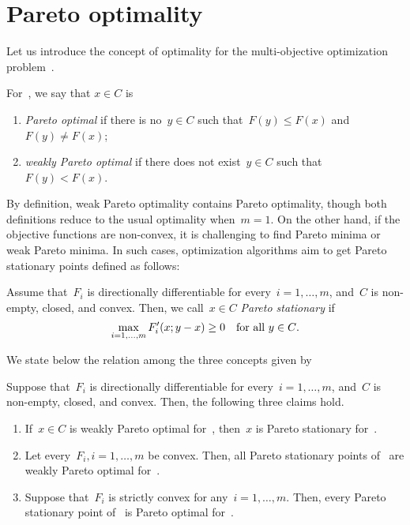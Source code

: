 \documentclass[../main]{subfiles}
\begin{document}
\section{Pareto optimality}
Let us introduce the concept of optimality for the multi-objective optimization problem~.
\begin{definition} 
    For~, we say that $x \in C$ is
    \begin{enumerate}
        \item \emph{Pareto optimal} if there is no~$y \in C$ such that~$F(y) \le F(x)$ and~$F(y) \neq F(x)$; 
        \item \emph{weakly Pareto optimal} if there does not exist~$y \in C$ such that~$F(y) < F(x)$. 
    \end{enumerate}
\end{definition}
By definition, weak Pareto optimality contains Pareto optimality, though both definitions reduce to the usual optimality when~$m = 1$.
On the other hand, if the objective functions are non-convex, it is challenging to find Pareto minima or weak Pareto minima.
In such cases, optimization algorithms aim to get Pareto stationary points defined as follows:
\begin{definition} 
    Assume that~$F_i$ is directionally differentiable for every~$i = 1, \dots, m$, and~$C$ is non-empty, closed, and convex.
    Then, we call~$x \in C$ \emph{Pareto stationary} if~
    \begin{equation}
        \max_{i = 1, \dots, m} F_i'(x; y - x) \ge 0 \quad \text{for all~$y \in C$}
    .\end{equation} 
\end{definition}
We state below the relation among the three concepts given by~
\begin{lemma} 
    Suppose that~$F_i$ is directionally differentiable for every~$i = 1, \dots, m$, and~$C$ is non-empty, closed, and convex.
    Then, the following three claims hold.
    \begin{enumerate}
        \item If~$x \in C$ is weakly Pareto optimal for~, then~$x$ is Pareto stationary for~. 
        \item Let every~$F_i, i = 1, \dots, m$ be convex. Then, all Pareto stationary points of~ are weakly Pareto optimal for~. 
        \item Suppose that~$F_i$ is strictly convex for any~$i = 1, \dots, m$. Then, every Pareto stationary point of~ is Pareto optimal for~. 
    \end{enumerate}
\end{lemma}
\end{document}
